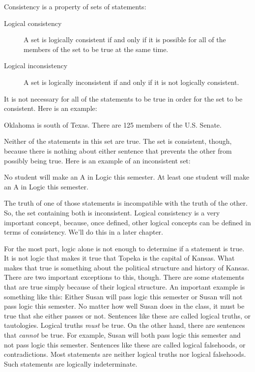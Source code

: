 \documentclass[../logic-text.tex]{subfiles}
\begin{document}
Consistency is a property of sets of statements:

\begin{description}
  \item[Logical consistency] A set is logically consistent if and only if it is possible for all of the members of the set to be true at the same time.
  \item[Logical inconsistency] A set is logically inconsistent if and only if it is not logically consistent. 
\end{description}

It is not necessary for all of the statements to be true in order for the set to be consistent. Here is an example:

{Oklahoma is south of Texas. There are 125 members of the U.S. Senate.}

Neither of the statements in this set are true. The set is consistent, though, because there is nothing about either sentence that prevents the other from possibly being true. Here is an example of an inconsistent set:

{No student will make an A in Logic this semester. At least one student will make an A in Logic this semester.}

The truth of one of those statements is incompatible with the truth of the other.
So, the set containing both is inconsistent.
Logical consistency is a very important concept, because, once defined, other logical concepts can be defined in terms of consistency.
We'll do this in a later chapter.

For the most part, logic alone is not enough to determine if a statement is true. It is not logic that makes it true that Topeka is the capital of Kansas. What makes that true is something about the political structure and history of Kansas. There are two important exceptions to this, though. There are some statements that are true simply because of their logical structure. An important example is something like this: Either Susan will pass logic this semester or Susan will not pass logic this semester. No matter how well Susan does in the class, it must be true that she either passes or not. Sentences like these are called logical truths, or tautologies. Logical truths {\em must} be true. On the other hand, there are sentences that {\em cannot} be true. For example, Susan will both pass logic this semester and not pass logic this semester. Sentences like these are called logical falsehoods, or contradictions. Most statements are neither logical truths nor logical falsehoods. Such statements are logically indeterminate.
\end{document}
